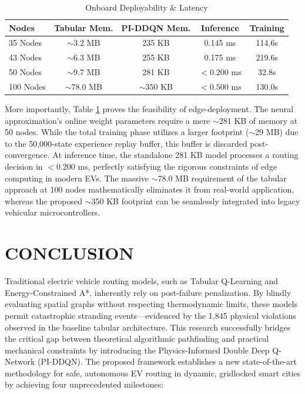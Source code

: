 \documentclass[journal, a4paper, twocolumn]{IEEEtran}
\begin{document}
\begin{table}[htbp]
\centering
\caption{Onboard Deployability \& Latency}
\label{tab:onboard_latency}
\footnotesize
\begin{tabular}{@{}l|cccc@{}}
\toprule
\textbf{Nodes} & \textbf{Tabular Mem.} & \textbf{PI-DDQN Mem.} & \textbf{Inference} & \textbf{Training} \\ \midrule 
35 Nodes & $\sim$3.2 MB & 235 KB & 0.145 ms & 114.6s \\ 
43 Nodes & $\sim$6.3 MB & 255 KB & 0.175 ms & 219.6s \\ 
50 Nodes & $\sim$9.7 MB & 281 KB & $< 0.200$ ms & 32.8s \\ 
100 Nodes & $\sim$78.0 MB & $\sim$350 KB & $< 0.500$ ms & 130.0s \\ \bottomrule
\end{tabular}
\end{table}

More importantly, Table \ref{tab:onboard_latency} proves the feasibility of edge-deployment. The neural approximation's online weight parameters require a mere $\sim$281 KB of memory at 50 nodes. While the total training phase utilizes a larger footprint ($\sim$29 MB) due to the 50,000-state experience replay buffer, this buffer is discarded post-convergence. At inference time, the standalone 281 KB model processes a routing decision in $< 0.200$ ms, perfectly satisfying the rigorous constraints of edge computing in modern EVs. The massive $\sim$78.0 MB requirement of the tabular approach at 100 nodes mathematically eliminates it from real-world application, whereas the proposed $\sim$350 KB footprint can be seamlessly integrated into legacy vehicular microcontrollers.

\section{CONCLUSION}
\label{sec:conclusion}
Traditional electric vehicle routing models, such as Tabular Q-Learning and Energy-Constrained A*, inherently rely on post-failure penalization. By blindly evaluating spatial graphs without respecting thermodynamic limits, these models permit catastrophic stranding events---evidenced by the 1,845 physical violations observed in the baseline tabular architecture. This research successfully bridges the critical gap between theoretical algorithmic pathfinding and practical mechanical constraints by introducing the Physics-Informed Double Deep Q-Network (PI-DDQN). The proposed framework establishes a new state-of-the-art methodology for safe, autonomous EV routing in dynamic, gridlocked smart cities by achieving four unprecedented milestones:
\end{document}
